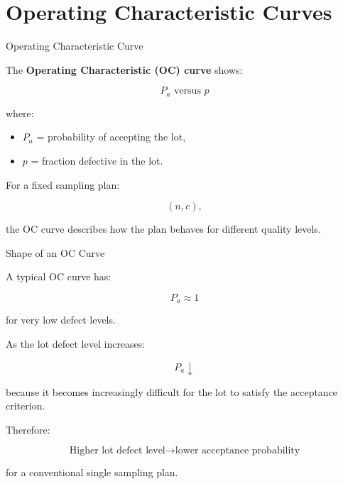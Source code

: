 \documentclass[aspectratio=169,10pt]{beamer}
\begin{document}

\section{Operating Characteristic Curves}

\begin{frame}[shrink=18]{Operating Characteristic Curve}
\small

The \textbf{Operating Characteristic (OC) curve} shows:

\[
\boxed{
P_a
\text{ versus }
p
}
\]

where:

\begin{itemize}
    \item \(P_a\) = probability of accepting the lot,
    \item \(p\) = fraction defective in the lot.
\end{itemize}

For a fixed sampling plan:

\[
(n,c),
\]

the OC curve describes how the plan behaves for different
quality levels.

\end{frame}


\begin{frame}[shrink=18]{Shape of an OC Curve}
\small

A typical OC curve has:

\[
P_a\approx1
\]

for very low defect levels.

As the lot defect level increases:

\[
P_a\downarrow
\]

because it becomes increasingly difficult for the lot to satisfy
the acceptance criterion.

Therefore:

\[
\boxed{
\text{Higher lot defect level}
\rightarrow
\text{lower acceptance probability}
}
\]

for a conventional single sampling plan.

\end{frame}

\end{document}
